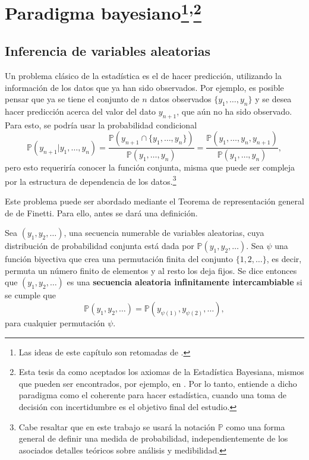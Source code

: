 \chapter[Paradigma bayesiano]{Paradigma bayesiano\footnote{Las ideas de este cap\'itulo son retomadas de \cite{Denison_BayesMethods}.}\textsuperscript{,}\footnote{Esta tesis da como aceptados los axiomas de la Estad\'istica Bayesiana, mismos que pueden ser encontrados, por ejemplo, en \cite{Fishburn_Axioms}. Por lo tanto, entiende a dicho paradigma como el coherente para hacer estad\'istica, cuando una toma de decisi\'on con incertidumbre es el objetivo final del estudio. 
}}

\section{Inferencia de variables aleatorias}

Un problema clásico de la estad\'istica es el de hacer predicci\'on, utilizando la informaci\'on de los datos que ya han sido observados. Por ejemplo, es posible pensar que ya se tiene el conjunto de $n$ datos observados $\{y_1, \ldots, y_n\}$ y se desea hacer predicci\'on acerca del valor del dato $y_{n+1}$, que a\'un no ha sido observado. Para esto, se podr\'ia usar la probabilidad condicional
\begin{equation*}
    \mathbb{P}(y_{n+1}|y_1,\ldots,y_n) =
    \frac{\mathbb{P}(y_{n+1} \cap \{y_1, \ldots, y_n\})}{\mathbb{P}(y_1, \ldots, y_n)} =
    \frac{\mathbb{P}(y_1, \ldots, y_n,y_{n+1})}{\mathbb{P}(y_1, \ldots, y_n)},
\end{equation*}
pero esto requerir\'ia conocer la funci\'on conjunta, misma que puede ser compleja por la estructura de dependencia de los datos.\footnote{Cabe resaltar que en este trabajo se usar\'a la notaci\'on $\mathbb{P}$ como una forma general de definir una medida de probabilidad, independientemente de los asociados detalles te\'oricos sobre an\'alisis y medibilidad.}

Este problema puede ser abordado mediante el Teorema de representaci\'on general de de Finetti. Para ello, antes se dar\'a una definici\'on.

\begin{defin*}
    Sea $(y_1,y_2,\ldots)$, una secuencia numerable de variables aleatorias, cuya distribuci\'on de probabilidad conjunta est\'a dada por $\mathbb{P}(y_1,y_2,\ldots)$. Sea $\psi$ una funci\'on biyectiva que crea una permutaci\'on finita del conjunto $\{1,2,\ldots\}$, es decir, permuta un n\'umero finito de elementos y al resto los deja fijos.  
    Se dice entonces que $(y_1,y_2,\ldots)$ es una \textbf{secuencia aleatoria infinitamente intercambiable} si se cumple que 
    \begin{equation*}
        \mathbb{P}(y_1,y_2,\ldots) = \mathbb{P}(y_{\psi(1)},y_{\psi(2)},\ldots),
    \end{equation*}
    para cualquier permutaci\'on $\psi$.
\end{defin*}

